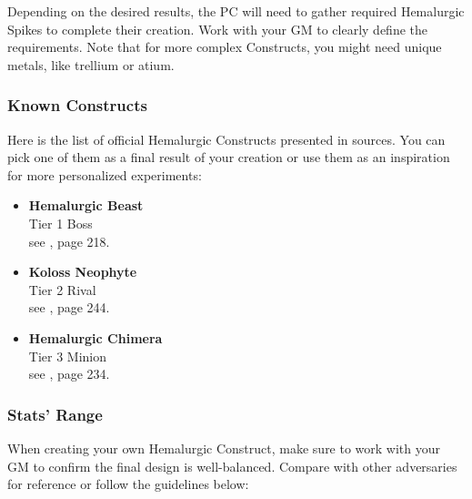 Depending on the desired results, the PC will need to gather required Hemalurgic Spikes to complete their creation. Work with your GM to clearly define the requirements. Note that for more complex Constructs, you might need unique metals, like trellium or atium.

\subsubsection{Known Constructs}

Here is the list of official Hemalurgic Constructs presented in \cosmereRPG{} sources. You can pick one of them as a final result of your creation or use them as an inspiration for more personalized experiments:

\begin{itemize}
	\item \textbf{Hemalurgic Beast} \\ Tier 1 Boss \\ see \bookMistbornLegacy{}, page 218.
	\item \textbf{Koloss Neophyte} \\ Tier 2 Rival \\ see \bookWorldGuideMistborn{}, page 244.
	\item \textbf{Hemalurgic Chimera} \\ Tier 3 Minion \\ see \bookWorldGuideMistborn{}, page 234.	
\end{itemize}


\subsubsection{Stats' Range}

When creating your own Hemalurgic Construct, make sure to work with your GM to confirm the final design is well-balanced. Compare with other \cosmereRPG{} adversaries for reference or follow the guidelines below:

